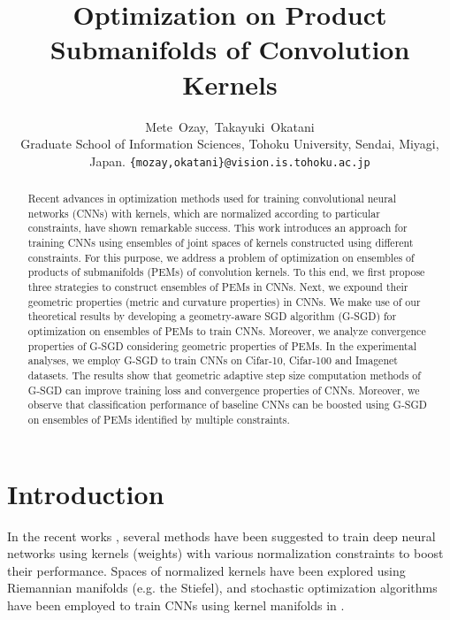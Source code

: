 \documentclass[10pt,journal,compsoc]{IEEEtran}
\theoremstyle{definition}
\theoremstyle{definition}
\theoremstyle{remark}
\theoremstyle{remark}
\theoremstyle{remark}
\begin{document}
 


\title{Optimization on Product Submanifolds of Convolution Kernels}

\author{Mete~Ozay,~Takayuki~Okatani\\
	Graduate School of Information Sciences, Tohoku University, Sendai, Miyagi, Japan.
	{\tt\small \{mozay,okatani\}@vision.is.tohoku.ac.jp} }


\maketitle


\begin{abstract} 
Recent advances in optimization methods used for training convolutional neural networks (CNNs) with kernels, which are normalized according to particular constraints, have shown remarkable success. This work introduces an approach for training CNNs using ensembles of joint spaces of kernels constructed using different constraints. For this purpose, we address a problem of optimization on ensembles of products of  submanifolds (PEMs) of convolution kernels. To this end, we first propose three strategies to construct ensembles of PEMs in CNNs. Next, we expound their geometric properties (metric and curvature properties) in CNNs. We make use of our theoretical results by developing a geometry-aware SGD algorithm (G-SGD) for optimization on ensembles of PEMs to train CNNs. Moreover, we analyze convergence properties of G-SGD considering geometric properties of PEMs. In the experimental analyses, we employ G-SGD to train CNNs on Cifar-10, Cifar-100 and Imagenet datasets. The results show that geometric adaptive step size computation methods of G-SGD can improve training loss and  convergence properties of CNNs. Moreover, we observe that classification performance of baseline CNNs can be boosted using G-SGD on ensembles of PEMs  identified by multiple constraints. 
\end{abstract} 

\section{Introduction}
\label{intro}


In the recent works  \cite{unit_evol,norm_prop,parseval,Henaff,Huang_2017_ICCV,icml2015_huanga15,SNN,IGAN,w_norm,AAAI1714830}, several methods have been suggested to train deep neural networks using kernels (weights) with various normalization constraints to boost their performance. Spaces of normalized kernels have been explored using Riemannian manifolds (e.g. the Stiefel), and stochastic optimization algorithms have been employed to train CNNs using kernel manifolds in \cite{RBN,haaai,huang162,oo16}. %
\end{document}
